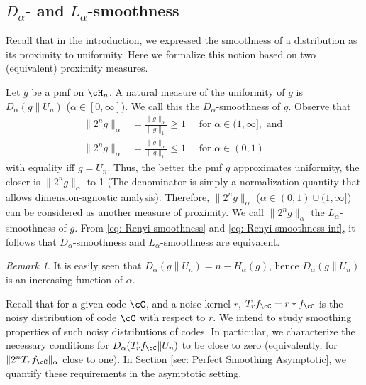 \documentclass{amsart}
\theoremstyle{remark}
\newtheorem{remark}{Remark}
\begin{document}
\subsection{\texorpdfstring{$D_{\alpha}$}{}- and \texorpdfstring{$L_{\alpha}$}{}-smoothness}\label{sec:lemmas}

Recall that in the introduction, we expressed the smoothness of a distribution as its proximity to uniformity. Here we formalize this notion based on two (equivalent) proximity measures.

Let $g$ be a pmf on $\cH_n$. A natural measure of the uniformity of $g$ is $D_{\alpha}(g\|U_n)$ ($\alpha \in [0,\infty]$). We call this the $D_{\alpha}$-smoothness of $g$.
Observe that
\begin{align}\label{eq:equiv}
    \|2^ng\|_\alpha &=  \frac{\|g\|_{\alpha} }{\|g\|_1 }\geq 1 \quad \text{ for }  \alpha \in (1,\infty], \text{ and } \\
   \|2^ng\|_\alpha &=  \frac{\|g\|_{\alpha} }{\|g\|_1 }\leq 1 \quad \text{ for }  \alpha \in (0,1)
\end{align}
with equality iff $g= U_n$. Thus, the better the pmf $g$ approximates uniformity, the closer is $\|2^ng\|_{\alpha} $ to 1 (The denominator is simply a normalization quantity that allows dimension-agnostic analysis). Therefore, $\|2^ng\|_{\alpha}$ ($\alpha \in (0,1) \cup (1,\infty]$) can be considered as another measure of proximity. We call $\|2^ng\|_{\alpha}$ the $L_{\alpha}$-smoothness of $g$. From \eqref{eq: Renyi smoothness} and \eqref{eq: Renyi smoothness-inf}, it follows that $D_{\alpha}$-smoothness and $L_\alpha$-smoothness are equivalent. 

\begin{remark}\label{rm: D_alpha mono}
    It is easily seen that $D_{\alpha}(g\|U_n) = n-H_{\alpha}(g)$, hence $D_{\alpha}(g\|U_n)$ is an increasing function of $\alpha$.
\end{remark}

Recall that for a given code $\cC$, and a noise kernel $r$, $T_rf_\cC = r \ast f_\cC$ is the noisy distribution of code $\cC$ with respect to $r$. We intend to study smoothing properties of such noisy distributions of codes. In particular, we characterize the necessary conditions for $D_{\alpha}(T_rf_\cC\|U_n) $ to be close to zero (equivalently, for $\|2^n T_rf_\cC\|_{\alpha}$ close to one). In Section \ref{sec: Perfect Smoothing Asymptotic}, we quantify these requirements in the asymptotic setting.
\end{document}
